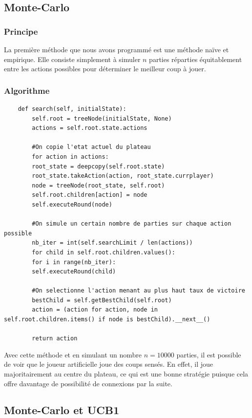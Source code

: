 \documentclass[a4paper]{article}
\theoremstyle{definition}
\begin{document}
\subsection{Monte-Carlo}

\subsubsection{Principe}

La première méthode que nous avons programmé est une méthode naïve et empirique. Elle consiste simplement à simuler $n$ parties réparties équitablement entre les actions possibles pour déterminer le meilleur coup à jouer.

\subsubsection{Algorithme}

\begin{lstlisting}
	def search(self, initialState):
		self.root = treeNode(initialState, None)
		actions = self.root.state.actions
	
		#On copie l'etat actuel du plateau
		for action in actions:
		root_state = deepcopy(self.root.state)
		root_state.takeAction(action, root_state.currplayer)
		node = treeNode(root_state, self.root)
		self.root.children[action] = node
		self.executeRound(node)
		
		#On simule un certain nombre de parties sur chaque action possible
		nb_iter = int(self.searchLimit / len(actions))
		for child in self.root.children.values():
		for i in range(nb_iter):
		self.executeRound(child)
		
		#On selectionne l'action menant au plus haut taux de victoire
		bestChild = self.getBestChild(self.root)
		action = (action for action, node in self.root.children.items() if node is bestChild).__next__()
		
		return action
\end{lstlisting}

Avec cette méthode et en simulant un nombre $n=10000$ parties, il est possible de voir que le joueur artificielle joue des coups sensés. En effet, il joue majoritairement au centre du plateau, ce qui est une bonne stratégie puisque cela offre davantage de possibilité de connexions par la suite.

\newpage 


\subsection{Monte-Carlo et UCB1}
\end{document}
